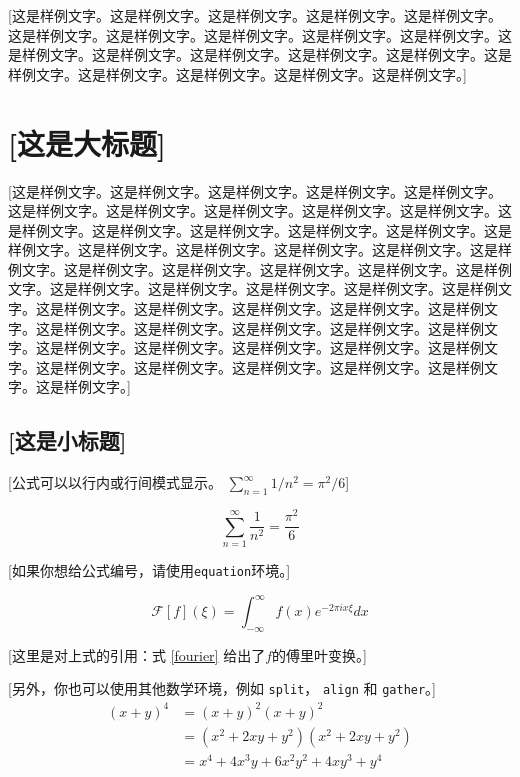 \documentclass[a4paper,11pt,onecolumn,twoside]{article}
\begin{document}
[这是样例文字。这是样例文字。这是样例文字。这是样例文字。这是样例文字。这是样例文字。这是样例文字。这是样例文字。这是样例文字。这是样例文字。这是样例文字。这是样例文字。这是样例文字。这是样例文字。这是样例文字。这是样例文字。这是样例文字。这是样例文字。这是样例文字。这是样例文字。]

\section{[这是大标题]}
[这是样例文字。这是样例文字。这是样例文字。这是样例文字。这是样例文字。这是样例文字。这是样例文字。这是样例文字。这是样例文字。这是样例文字。这是样例文字。这是样例文字。这是样例文字。这是样例文字。这是样例文字。这是样例文字。这是样例文字。这是样例文字。这是样例文字。这是样例文字。这是样例文字。这是样例文字。这是样例文字。这是样例文字。这是样例文字。这是样例文字。这是样例文字。这是样例文字。这是样例文字。这是样例文字。这是样例文字。这是样例文字。这是样例文字。这是样例文字。这是样例文字。这是样例文字。这是样例文字。这是样例文字。这是样例文字。这是样例文字。这是样例文字。这是样例文字。这是样例文字。这是样例文字。这是样例文字。这是样例文字。这是样例文字。这是样例文字。这是样例文字。这是样例文字。这是样例文字。这是样例文字。]

\subsection{[这是小标题]}
[公式可以以行内或行间模式显示。 $\sum_{n = 1} ^ {\infty} 1/n^2 = \pi^2/6 $]

$$ \sum_{n=1}^{\infty} \frac{1}{n^2} = \frac{\pi^2}{6} $$

[如果你想给公式编号，请使用\texttt{equation}环境。]

  \begin{equation} \label{fourier}
    \mathcal{F}[f](\xi) = \int_{-\infty}^{\infty} f(x) e^{-2\pi ix \xi} dx
  \end{equation}

[这里是对上式的引用：式 \ref{fourier} 给出了$f$的傅里叶变换。]

  [另外，你也可以使用其他数学环境，例如 \texttt{split}， \texttt{align} 和 \texttt{gather}。]
  \begin{equation}
  \begin{split}
    (x+y)^4 &= (x+y)^2 (x+y)^2 \\
            &= (x^2+2xy+y^2)(x^2+2xy+y^2) \\
            &= x^4 + 4x^3y+6x^2y^2+4xy^3+y^4
  \end{split}
  \end{equation}
\end{document}
